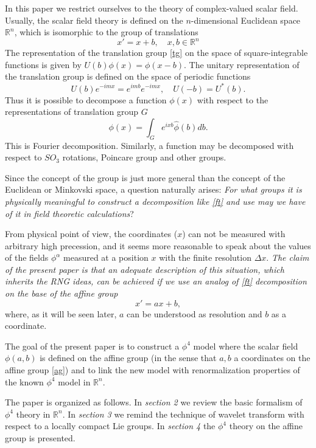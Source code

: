 \documentclass[a4paper,a4paper]{article}
\newcommand{\R}{\mathbb{R}}
\begin{document}
In this paper we restrict ourselves to the theory of complex-valued 
scalar field. Usually, the scalar field theory is defined on the 
$n$-dimensional Euclidean space $\R^n$, which is isomorphic to the group 
of translations 
\begin{equation}
x' = x+b,\quad x,b \in \R^n
\label{tg}
\end{equation}
The representation of the translation group \eqref{tg} on the space 
of square-integrable functions is given by 
$
U(b)\phi(x) = \phi(x-b)
$.
The unitary representation of the translation group is defined 
on the space of periodic functions 
$$U(b) e^{-imx} = e^{imb} e^{-imx},\quad  U(-b) = U^*(b).$$
Thus it is possible to decompose a function $\phi(x)$ with 
respect to the representations of translation group $G$
\begin{equation}
\phi(x) = \int_G e^{ixb} \hat \phi(b) db.
\label{ft} 
\end{equation}
This is Fourier decomposition.
Similarly, a function may be decomposed with respect to $SO_3$ rotations, 
Poincare group \cite{Klauder} and other groups. 

Since the concept of the group is just more general than the concept 
of the Euclidean or Minkovski space, a question naturally arises: {\em For 
what groups it is physically meaningful to construct a decomposition 
like \eqref{ft} and use may we have of it in field theoretic calculations}?

From physical point of view, the coordinates ($x$) can not be measured with 
arbitrary high precession, and it seems more reasonable to speak about 
the values of the fields  $\phi^\alpha$ measured at a position $x$ with 
the finite resolution $\Delta x$. {\em The claim of the present paper is 
that an adequate description of this situation, which inherits the 
RNG ideas, can be achieved if 
we use an analog of \eqref{ft} decomposition on the base of the affine 
group}
\begin{equation}
x' = a x + b
\label{ag}, 
\end{equation} 
where, as it will be seen later, $a$ can be understood as resolution and 
$b$ as a coordinate. 

The goal of the present paper is to construct a $\phi^4$ model where the 
scalar field $\phi(a,b)$ is defined on the affine group (in the sense 
that $a,b$ a coordinates on the affine group \eqref{ag}) and to link 
the new model with renormalization properties of the known $\phi^4$ model 
in $\R^n$. 

The paper is organized as follows. In {\em section 2} we review the basic 
formalism of $\phi^4$ theory in $\R^n$. In {\em section 3} we remind the 
technique of wavelet transform with respect to a locally compact Lie groups. 
In {\em section 4} the $\phi^4$ theory on the affine group is presented. 
 
\end{document}
